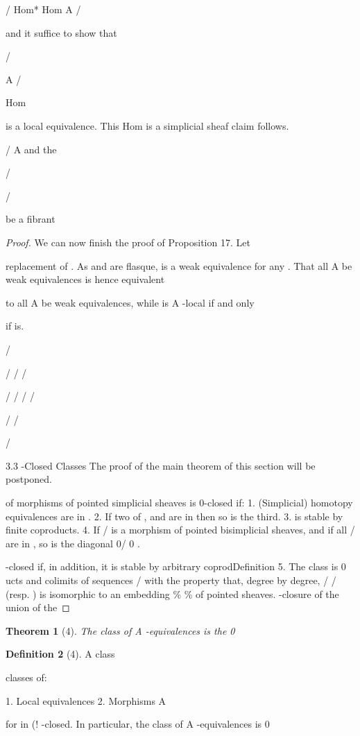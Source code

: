 \documentclass[11pt,a4paper]{article}
\theoremstyle{plain}
\newtheorem{theorem}{Theorem}
\theoremstyle{definition}
\newtheorem{definition}[theorem]{Definition}
\begin{document}
/
Hom*  Hom A   / 

and it suffice to show that

/

 A   / 

Hom

is a local equivalence. This Hom is a simplicial sheaf
claim follows.

  /  A and the


/

/

 be a fibrant
\begin{proof} We can now finish the proof of Proposition 17. Let


replacement of . As and
are flasque,
is a weak equivalence
for any . That all
 A be weak equivalences is hence equivalent

to all 
 A be weak equivalences, while is A -local if and only

if
is.


/

/ / /

/ /
/  /  

/ / 

/





3.3 -Closed Classes
The proof of the main theorem of this section will be postponed.

 of morphisms of pointed simplicial sheaves is 0-closed if:
1. (Simplicial) homotopy equivalences are in  .
2. If two of  ,  and  are in  then so is the third.
3.  is stable by finite coproducts.
4. If /
is a morphism of pointed bisimplicial sheaves, and if all
/
are
in
 , so is the diagonal 0/  0 .

 -closed if, in addition, it is stable by arbitrary coprodDefinition 5. The class  is 0
ucts and colimits of sequences /
 with the property that, degree by
degree, / 
/   (resp.       ) is isomorphic to an embedding
\%  \% of pointed sheaves.
 -closure of the union of the
\end{proof}

\begin{theorem}[4]
The class of A -equivalences is the 0
\end{theorem}

\begin{definition}[4]
A class

classes of:

1. Local equivalences
2. Morphisms
 A



 for  in (!
 -closed.
In particular, the class of A -equivalences is 0




\end{definition}
\end{document}
